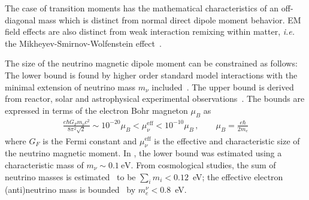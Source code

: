 The case of transition moments has the mathematical characteristics of an off-diagonal mass which is distinct from normal direct dipole moment behavior. EM field effects are also distinct from weak interaction remixing within matter, {\it i.e.\/} the Mikheyev-Smirnov-Wolfenstein effect~\citep{Wolfenstein:1977ue,Mikheyev:1985zog,Mikheev:1986wj,Smirnov:2003da}.



The size of the neutrino magnetic dipole moment can be constrained as follows: The lower bound is found by higher order standard model interactions with the minimal extension of neutrino mass $m_{\nu}$ included~\citep{Fujikawa:1980yx,Shrock:1980vy,Shrock:1982sc}. The upper bound is derived from reactor, solar and astrophysical experimental observations~\citep{Giunti:2015gga,Canas:2015yoa,Studenikin:2016ykv,AristizabalSierra:2021fuc}. The bounds are expressed in terms of the electron Bohr magneton $\mu_{B}$ as
\begin{align}
    \label{bound:1}
    \frac{e\hbar G_{F}m_{\nu}c^{2}}{8\pi^{2}\sqrt{2}} \sim 10^{-20}\mu_{B}<\mu_{\nu}^\mathrm{eff}<10^{-10}\mu_{B}\,,\qquad\mu_{B}=\frac{e\hbar}{2m_{e}}
\end{align}
where $G_{F}$ is the Fermi constant and $\mu_{\nu}^\mathrm{eff}$ is the effective and characteristic size of the neutrino magnetic moment. In , the lower bound was estimated using a characteristic mass of $m_{\nu}\sim0.1~\mathrm{eV}$. From cosmological studies, the sum of neutrino masses is estimated~\citep{Planck:2018vyg} to be $\sum_{i}m_{i}<0.12$~eV; the effective electron (anti)neutrino mass is bounded~\citep{KATRIN:2021uub} by $m_{e}^{\nu}<0.8$~eV.

